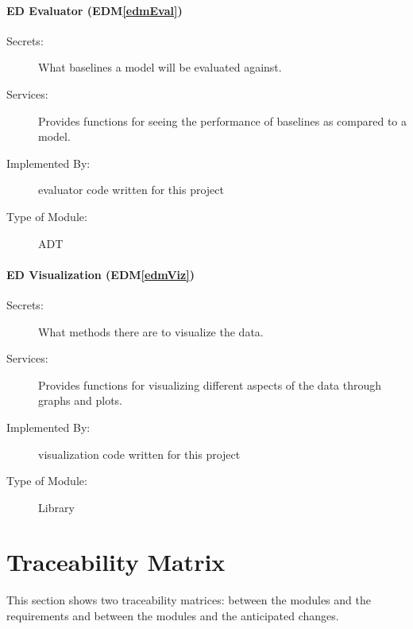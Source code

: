 \documentclass[12pt, titlepage]{article}
\newcommand{\edmref}[1]{EDM\ref{#1}}
\begin{document}
\paragraph{ED Evaluator (\edmref{edmEval})}
\begin{description}
\item[Secrets:] What baselines a model will be evaluated against.
\item[Services:] Provides functions for seeing the performance of baselines as compared to a model.
\item[Implemented By:] evaluator code written for this project
\item[Type of Module:] ADT
\end{description}

\paragraph{ED Visualization (\edmref{edmViz})}
\begin{description}
\item[Secrets:] What methods there are to visualize the data.
\item[Services:] Provides functions for visualizing different aspects of the data through graphs and plots.
\item[Implemented By:] visualization code written for this project
\item[Type of Module:] Library
\end{description}


\section{Traceability Matrix} \label{SecTM}

This section shows two traceability matrices: between the modules and the
requirements and between the modules and the anticipated changes.
\end{document}
